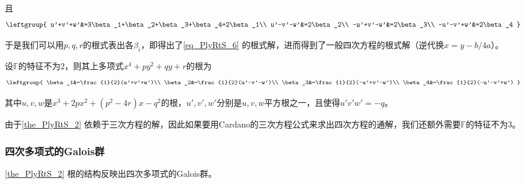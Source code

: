 且
\begin{equation}
\leftgroup{
    u'+v'+w'&=3\beta_1+\beta_2+\beta_3+\beta_4=2\beta_1\\
    u'-v'-w'&=2\beta_2\\
    -u'+v'-w'&=2\beta_3\\
    -u'-v'+w'&=2\beta_4
}
\end{equation}

于是我们可以用$p, q, r$的根式表出各$\beta_i$，即得出了\autoref{eq_PlyRtS_6} 的根式解，进而得到了一般四次方程的根式解（逆代换$x=y-b/4a$）。

\begin{theorem}{}\label{the_PlyRtS_2}

设$\mathbb{F}$的特征不为$2$，则其上多项式$x^4+py^2+qy+r$的根为
\begin{equation}
\leftgroup{
    \beta_1&=\frac{1}{2}(u'+v'+w')\\
    \beta_2&=\frac{1}{2}(u'-v'-w')\\
    \beta_3&=\frac{1}{2}(-u'+v'-w')\\
    \beta_4&=\frac{1}{2}(-u'-v'+w')
}
\end{equation}

其中$u, v, w$是$x^3+2px^2+(p^2-4r)x-q^2$的根，$u', v', w'$分别是$u, v, w$平方根之一，且使得$u'v'w'=-q$。

\end{theorem}

由于\autoref{the_PlyRtS_2} 依赖于三次方程的解，因此如果要用Cardano的三次方程公式来求出四次方程的通解，我们还额外需要$\mathbb{F}$的特征不为$3$。


\subsubsection{四次多项式的Galois群}


\autoref{the_PlyRtS_2} 根的结构反映出四次多项式的Galois群。

